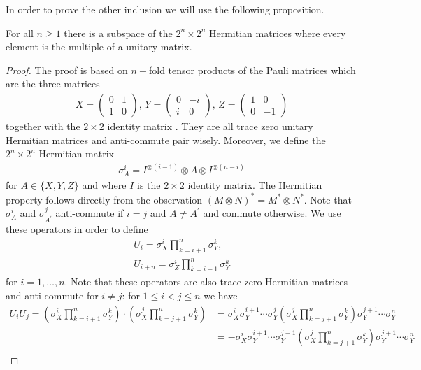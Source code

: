 \noindent In order to prove the other inclusion we will use the following proposition. 
\begin{prop} \label{PauliProp}
For all $ n \ge 1 $ there is a subspace of the $ 2^n \times 2^n $ Hermitian matrices where every element is the multiple of a unitary matrix. 
\end{prop}
\begin{proof}
The proof is based on $ n- $fold tensor products of the Pauli matrices which are the three matrices 
\begin{align*}
X = \begin{pmatrix}
0 & 1 \\ 1 & 0
\end{pmatrix}, \, Y = \begin{pmatrix}
0 & -i \\ i & 0
\end{pmatrix}, \, Z = \begin{pmatrix}
1 & 0 \\ 0 & -1
\end{pmatrix}
\end{align*}
together with the $ 2 \times 2 $ identity matrix .
They are all trace zero unitary Hermitian matrices and anti-commute pair wisely. 
Moreover, we define the $ 2^n \times 2^n $ Hermitian matrix 
\begin{align*}
\sigma_A^i = I^{\otimes (i-1)} \otimes A \otimes I^{\otimes (n-i)}
\end{align*}
for $ A \in \{ X,Y,Z \}$ and where $ I $ is the $ 2 \times 2 $ identity matrix. The Hermitian property follows directly from the observation $ (M \otimes N)^* = M^* \otimes N^* $.
Note that $ \sigma_A^i $ and $ \sigma_{A^{\prime}}^j $ anti-commute if $ i = j $ and $ A \neq A^{\prime} $ and commute otherwise. We use these operators in order to define 
\begin{align*}
U_i = \sigma_X^i \prod_{k = i+1}^{n}\sigma_Y^k, \\
U_{i+n} = \sigma_Z^i \prod_{k = i+1}^n \sigma_Y^k
\end{align*}
for $ i = 1,\hdots,n $. Note that these operators are also trace zero Hermitian matrices and anti-commute for $ i \neq j $:    
for $ 1 \le i < j  \le n$ we have 
\begin{align*}
U_iU_j = (\sigma_X^i \prod_{k = i+1}^{n}\sigma_Y^k) \cdot( \sigma_X^j \prod_{k = j+1}^{n}\sigma_Y^k) &= \sigma_X^i \sigma_Y^{i+1} \cdots \sigma_Y^j ( \sigma_X^j \prod_{k = j+1}^{n}\sigma_Y^k) \sigma_Y^{j+1} \cdots \sigma_Y^n \\
&= - \sigma_X^i \sigma_Y^{i+1} \cdots \sigma_Y^{j-1} ( \sigma_X^j \prod_{k = j+1}^{n}\sigma_Y^k) \sigma_Y^{j+1} \cdots \sigma_Y^n  \\

\end{align*}
\end{proof}
